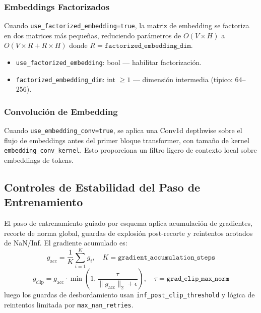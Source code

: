 \subsubsection{Embeddings Factorizados}
Cuando \texttt{use\_factorized\_embedding=true}, la matriz de embedding se factoriza en dos matrices más pequeñas, reduciendo parámetros de $O(V \times H)$ a $O(V \times R + R \times H)$ donde $R = \texttt{factorized\_embedding\_dim}$.
\begin{itemize}[leftmargin=*]
    \item \texttt{use\_factorized\_embedding}: bool --- habilitar factorización.
    \item \texttt{factorized\_embedding\_dim}: int $\ge 1$ --- dimensión intermedia (típico: 64--256).
\end{itemize}

\subsubsection{Convolución de Embedding}
Cuando \texttt{use\_embedding\_conv=true}, se aplica una Conv1d depthwise sobre el flujo de embeddings antes del primer bloque transformer, con tamaño de kernel \texttt{embedding\_conv\_kernel}. Esto proporciona un filtro ligero de contexto local sobre embeddings de tokens.

\subsection{Controles de Estabilidad del Paso de Entrenamiento}

El paso de entrenamiento guiado por esquema aplica acumulación de gradientes, recorte de norma global, guardas de explosión post-recorte y reintentos acotados de NaN/Inf. El gradiente acumulado es:
\[
g_{\text{acc}}=\frac{1}{K}\sum_{i=1}^{K} g_i,\quad K=\texttt{gradient\_accumulation\_steps}
\]
\[
g_{\text{clip}} = g_{\text{acc}}\cdot
\min\left(1,\frac{\tau}{\|g_{\text{acc}}\|_2+\epsilon}\right),\quad
\tau=\texttt{grad\_clip\_max\_norm}
\]
luego los guardas de desbordamiento usan \texttt{inf\_post\_clip\_threshold} y lógica de reintentos limitada por \texttt{max\_nan\_retries}.

